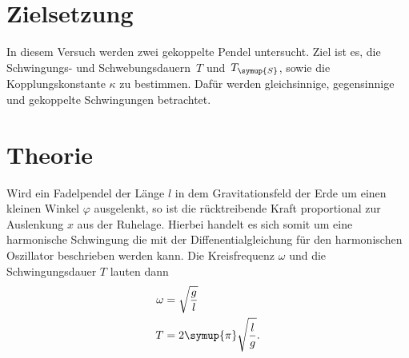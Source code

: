 \section{Zielsetzung}
\label{sec:Zielsetzung}
In diesem Versuch werden zwei gekoppelte Pendel untersucht. Ziel ist es, die Schwingungs- und Schwebungsdauern~$T$ und~$T_{\symup{S}}$, sowie die
Kopplungskonstante $\kappa$ zu bestimmen. Dafür werden gleichsinnige, gegensinnige und gekoppelte Schwingungen betrachtet.

\section{Theorie}
\label{sec:Theorie}
Wird ein Fadelpendel der Länge $l$ in dem Gravitationsfeld der Erde um einen kleinen Winkel $\varphi$ ausgelenkt, so ist die rücktreibende Kraft
proportional zur Auslenkung $x$ aus der Ruhelage. Hierbei handelt es sich somit um eine harmonische Schwingung die mit der Diffenentialgleichung für
den harmonischen Oszillator beschrieben werden kann. Die Kreisfrequenz $\omega$ und die Schwingungsdauer $T$ lauten dann
\begin{align}
    \omega &= \sqrt{\frac{g}{l}} \label{eq:Kreisfrequenz} \\
    T &= 2\symup{\pi}\sqrt{\frac{l}{g}}. \label{eq:Schwingungsdauer}
\end{align}
